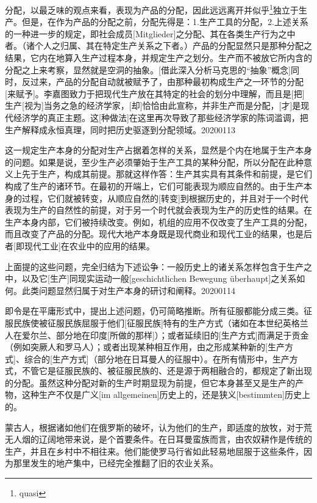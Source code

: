 \documentclass[a5paper,twoside,10.5pt]{ctexart}
\begin{document}
分配，以最乏味的观点来看，表现为产品的分配，因此远远离开并似乎\footnote{quasi}独立于生产。但是，在作为产品的分配之前，分配先得是：1.生产工具的分配，2.上述关系的一种进一步的规定，即社会成员[Mitglieder]之分配、其在各类生产行为之中者。（诸个人之归属、其在特定生产关系之下者。）产品的分配显然只是那种分配之结果，它内在地算入生产过程本身，并规定生产之划分。生产而不被放它所内含的分配之上来考察，显然就是空洞的抽象。[借此深入分析马克思的“抽象”概念]同时，反过来，产品的分配自动就被赋予了，由那种最初构成生产之一环节的分配[来赋予]。李嘉图致力于把现代生产放在其特定的社会的划分中理解，而且是[把]生产[视为]当务之急的经济学家，[却]恰恰由此宣称，并非生产而是分配，[才]是现代经济学的真正主题。这[种做法]在这里再次导致了那些经济学家的陈词滥调，把生产解释成永恒真理，同时把历史驱逐到分配领域。20200113

这一规定生产本身的分配对生产占据着怎样的关系，显然是个内在地属于生产本身的问题。如果是说，至少生产必须肇始于生产工具的某种分配，所以分配在此种意义上先于生产，构成其前提。那就这样作答：生产其实具有其条件和前提，是它们构成了生产的诸环节。在最初的开端上，它们可能表现为顺应自然的。由于生产本身的过程，它们就被转变，从顺应自然的[转变]到根据历史的，并且对于一个时代表现为生产的自然性的前提，对于另一个时代就会表现为生产的历史性的结果。在生产本身内部，它们被持续改变。例如，机组的应用不仅改变了生产工具的分配，而且改变了产品的分配。现代大地产本身既是现代商业和现代工业的结果，也是后者[即现代工业]在农业中的应用的结果。

上面提的这些问题，完全归结为下述讼争：一般历史上的诸关系怎样包含于生产之中，以及它[生产]同现实运动一般[geschichtlichen Bewegung überhaupt]之关系如何。此类问题显然归属于对生产本身的研讨和阐释。20200114

即令是在平庸形式中，提出上述问题，仍可简略推断。所有征服都能分成三类。征服民族使被征服民族屈服于他们[征服民族]特有的生产方式（诸如在本世纪英格兰人在爱尔兰、部分地在印度[所做的那样]）；或者延续旧的[生产方式]而满足于贡金（例如突厥人和罗马人）；或者出现某种相互作用，由之形成某种新的[生产方式]、综合的[生产方式]（部分地在日耳曼人的征服中）。在所有情形中，生产方式，不管它是征服民族的、被征服民族的、还是源于两相融合的，都规定了新出现的分配。虽然这种分配对新的生产时期显现为前提，但它本身甚至又是生产的产物，这种生产不仅是广义[im allgemeinen]历史上的，还是狭义[bestimmten]历史上的。

蒙古人，根据诸如他们在俄罗斯的破坏，认为他们的生产，即适度的放牧，对于荒无人烟的辽阔地带来说，是个首要条件。在日耳曼蛮族而言，由农奴耕作是传统的生产，并且在乡村中不相往来。他们能使罗马行省如此轻易地屈服于这些条件，因为那里发生的地产集中，已经完全推翻了旧的农业关系。
\end{document}

